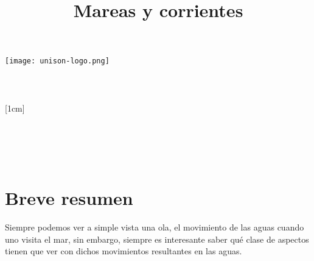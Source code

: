 \documentclass[a4paper,12pt]{article}
\title{Mareas y corrientes}
\author{}
\newcommand{\vacio}{\textcolor{white}{holacaracola}}
\newcommand{\director}{Carlos Lizárraga Celaya}
\begin{document}
\begin{titlepage}
\begin{center}
\vspace{1cm}

\texttt{[image: unison-logo.png]}
\\[0.5cm]
{\fontsize{24}{6}\selectfont{UNIVERSIDAD DE SONORA}}\\
[1em]
{\fontsize{16}{5}\selectfont{DEPARTAMENTO DE FÍSICA}}\\
[4em]
\textcolor{azulportada}
{\fontsize{30}{5}\selectfont{\textsc{\thetitle}}}\\
[1cm]
{\fontsize{16}{5}\selectfont{Alumno:}}\\
[0.2cm]
{\fontsize{14}{5}\selectfont{Luis Alfonso Torres Flores}}\\
[1cm]
{\fontsize{16}{5}\selectfont{Profesor}}\\
[0.2cm]
{\fontsize{16}{5}\selectfont{\director}}\\
[4.5cm]
{\fontsize{14}{5}\selectfont{27 de Febrero de 2017}}\\
[4cm]
\end{center}
\restoregeometry
\end{titlepage}

\newpage
\renewcommand{\headrulewidth}{0.5pt}
\fancyhead[L]{\vacio}

\newpage
\tableofcontents
\newpage
\section{Breve resumen}
\noindent
Siempre podemos ver a simple vista una ola, el movimiento de las aguas cuando uno visita el mar, sin embargo, siempre es interesante saber qué clase de aspectos tienen que ver con dichos movimientos resultantes en las aguas.
\end{document}
